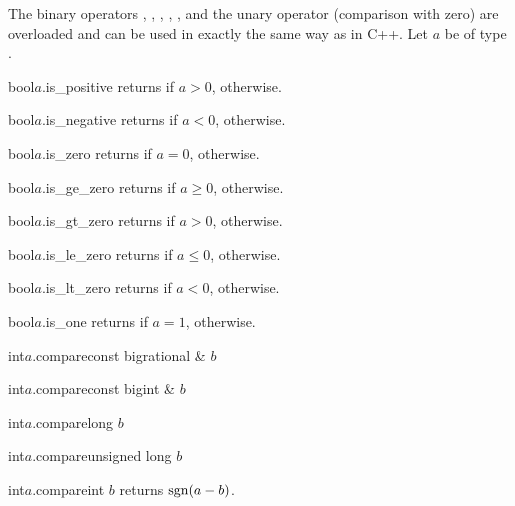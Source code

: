 
\COMP

The binary operators \code{==}, \code{!=}, \code{>=}, \code{<=}, \code{>}, \code{<} and the
unary operator \code{!} (comparison with zero) are overloaded and can be used in exactly the
same way as in C++.  Let $a$ be of type .

\begin{cfcode}{bool}{$a$.is_positive}{}
  returns \TRUE if $a > 0$, \FALSE otherwise.
\end{cfcode}

\begin{cfcode}{bool}{$a$.is_negative}{}
  returns \TRUE if $a < 0$, \FALSE otherwise.
\end{cfcode}

\begin{cfcode}{bool}{$a$.is_zero}{}
  returns \TRUE if $a = 0$, \FALSE otherwise.
\end{cfcode}

\begin{cfcode}{bool}{$a$.is_ge_zero}{}
  returns \TRUE if $a \geq 0$, \FALSE otherwise.
\end{cfcode}

\begin{cfcode}{bool}{$a$.is_gt_zero}{}
  returns \TRUE if $a > 0$, \FALSE otherwise.
\end{cfcode}

\begin{cfcode}{bool}{$a$.is_le_zero}{}
  returns \TRUE if $a \leq 0$, \FALSE otherwise.
\end{cfcode}

\begin{cfcode}{bool}{$a$.is_lt_zero}{}
  returns \TRUE if $a < 0$, \FALSE otherwise.
\end{cfcode}

\begin{cfcode}{bool}{$a$.is_one}{}
  returns \TRUE if $a = 1$, \FALSE otherwise.
\end{cfcode}

\begin{cfcode}{int}{$a$.compare}{const bigrational & $b$}\end{cfcode}
\begin{cfcode}{int}{$a$.compare}{const bigint & $b$}\end{cfcode}
\begin{cfcode}{int}{$a$.compare}{long $b$}\end{cfcode}
\begin{cfcode}{int}{$a$.compare}{unsigned long $b$}\end{cfcode}
\begin{cfcode}{int}{$a$.compare}{int $b$}
  returns $\operatorname{sgn}(a - b)$.
\end{cfcode}

